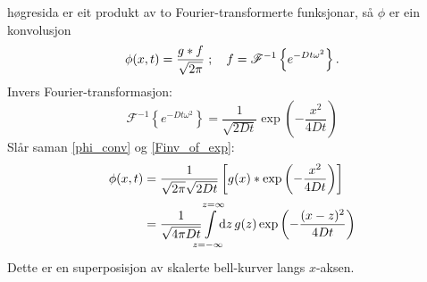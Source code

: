 \documentclass[12pt]{article}
\begin{document}
\begin{multicols*}{2}
\[    \]
    høgresida er eit produkt av to Fourier-transformerte funksjonar,
    så $\phi$ er ein konvolusjon
    \begin{equation}
        \label{phi_conv}
        \phi(x, t) = \frac{g * f}{\sqrt{2\pi}} \;;\quad
        f = \mathscr F^{-1}\left\{e^{-Dt\omega^2}\right\}
             \text.
    \end{equation}
    Invers Fourier-transformasjon:
    \begin{equation}
        \label{Finv_of_exp}
        \mathscr F^{-1}\left\{e^{-Dt\omega^2}\right\}
        = \frac{1}{\sqrt{2Dt}} \exp \left( -\frac{x^2}{4Dt} \right)
    \end{equation}
    Slår saman \eqref{phi_conv} og \eqref{Finv_of_exp}:
    \begin{equation}
        \begin{split}
            \phi(x, t) &= \frac{1}{\sqrt{2\pi} \sqrt{2 D t}}
            \left[
                g(x) * \exp \left( -\frac{x^2}{4Dt} \right)
            \right] \\
                       &= \frac{1}{\sqrt{4 \pi D t}}
                       \smashoperator{\int\limits_{z = -\infty\mathstrut}^{z = \infty\mathstrut}}
                       \D z \, g(z)
                       \exp \left( -\frac{(x - z)^2}{4Dt} \right)
        \end{split}
    \end{equation}
    Dette er en superposisjon av skalerte bell-kurver langs $x$-aksen.
\end{multicols*}
\end{document}
